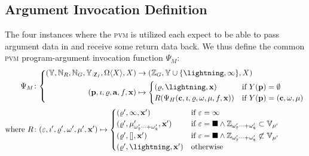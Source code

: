 \subsection{Argument Invocation Definition}

The four instances where the \textsc{pvm} is utilized each expect to be able to pass argument data in and receive some return data back. We thus define the common \textsc{pvm} program-argument invocation function $\Psi_M$:
\begin{align}
  \Psi_M&\colon \left\{\begin{aligned}
    (\Y, \N_R, \N_G, \Y_{:\mathsf{Z}_I}, \Omega\langle X \rangle, X) &\to (\mathbb{Z}_G, \Y \cup \{\panic, \oog\}, X)\\
    (\mathbf{p}, \imath, \gascounter, \mathbf{a}, f, \mathbf{x}) &\mapsto \begin{cases}
      (\gascounter, \panic, \mathbf{x}) &\when Y(\mathbf{p}) = \none\\
      R(\Psi_H(\mathbf{c}, \imath, \gascounter, \registers, \mem, f, \mathbf{x})) &\when Y(\mathbf{p}) = (\mathbf{c}, \registers, \mem)
    \end{cases}
  \end{aligned}\right.\\
  \where R&\colon (\varepsilon, \imath', \gascounter', \registers', \mem', \mathbf{x}') \mapsto \begin{cases}
    (\gascounter', \oog, \mathbf{x}') &\when \varepsilon = \oog \\
    (\gascounter', \memory'_{\registers'_{7}\dots+\registers'_{8}}, \mathbf{x}') &\when \varepsilon = \halt \wedge \mathbb{Z}_{\registers'_{7}\dots+\registers'_{8}} \subset \mathbb{V}_{\mem'} \\
    (\gascounter', [], \mathbf{x}') &\when \varepsilon = \halt \wedge \mathbb{Z}_{\registers'_{7}\dots+\registers'_{8}} \not\subset \mathbb{V}_{\mem'} \\
    (\gascounter', \panic, \mathbf{x}') &\otherwise \\
  \end{cases}
\end{align}

